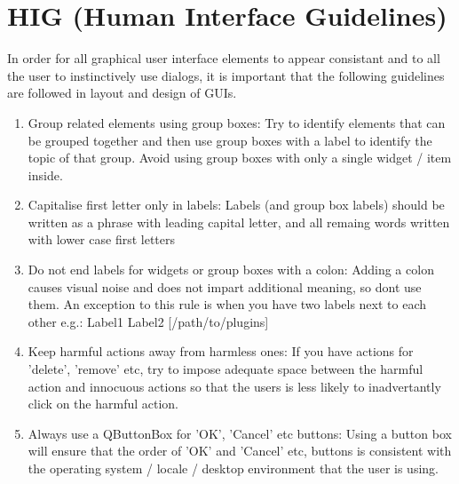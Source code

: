 \section{HIG (Human Interface Guidelines)}
In order for all graphical user interface elements to appear consistant and to
all the user to instinctively use dialogs, it is important that the following
guidelines are followed in layout and design of GUIs.

 \begin{enumerate}
 \item Group related elements using group boxes:
   Try to identify elements that can be grouped together and then use group
   boxes with a label to identify the topic of that group.  Avoid using group
   boxes with only a single widget / item inside.
 \item Capitalise first letter only in labels:
   Labels (and group box labels) should be written as a phrase with leading
   capital letter, and all remaing words written with lower case first letters 
 \item Do not end labels for widgets or group boxes with a colon:
   Adding a colon causes visual noise and does not impart additional meaning,
   so dont use them. An exception to this rule is when you have two labels next
   to each other e.g.: Label1  Label2 [/path/to/plugins]
 \item Keep harmful actions away from harmless ones:
   If you have actions for 'delete', 'remove' etc, try to impose adequate space
   between the harmful action and innocuous actions so that the users is less
   likely to inadvertantly click on the harmful action.
 \item Always use a QButtonBox for 'OK', 'Cancel' etc buttons:
   Using a button box will ensure that the order of 'OK' and 'Cancel' etc,
   buttons is consistent with the operating system / locale / desktop
   environment that the user is using.
 \end{enumerate}

